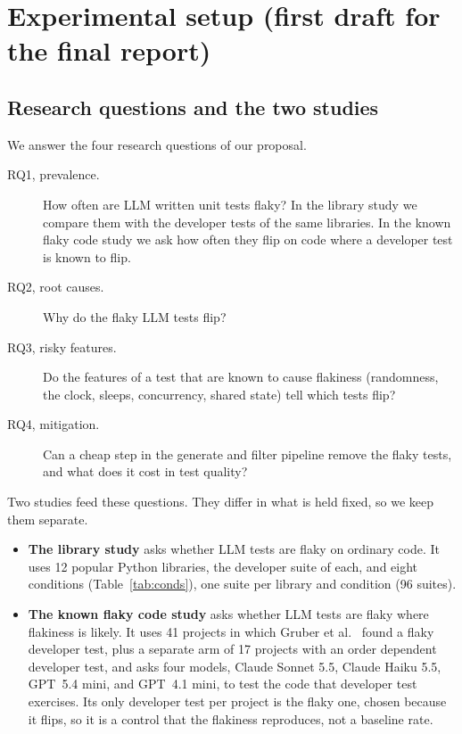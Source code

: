 \section{Experimental setup (first draft for the final report)}
\label{sec:setup}

\subsection{Research questions and the two studies}
We answer the four research questions of our proposal.
\begin{description}
\item[RQ1, prevalence.] How often are LLM written unit tests flaky? In the library study we compare them with the developer tests of the same libraries. In the known flaky code study we ask how often they flip on code where a developer test is known to flip.
\item[RQ2, root causes.] Why do the flaky LLM tests flip?
\item[RQ3, risky features.] Do the features of a test that are known to cause flakiness (randomness, the clock, sleeps, concurrency, shared state) tell which tests flip?
\item[RQ4, mitigation.] Can a cheap step in the generate and filter pipeline remove the flaky tests, and what does it cost in test quality?
\end{description}
Two studies feed these questions. They differ in what is held fixed, so we keep them separate.
\begin{itemize}
\item \textbf{The library study} asks whether LLM tests are flaky on ordinary code. It uses 12 popular Python libraries, the developer suite of each, and eight conditions (Table~\ref{tab:conds}), one suite per library and condition (96 suites).
\item \textbf{The known flaky code study} asks whether LLM tests are flaky where flakiness is likely. It uses 41 projects in which Gruber et al.~\cite{gruber2021} found a flaky developer test, plus a separate arm of 17 projects with an order dependent developer test, and asks four models, Claude Sonnet 5.5, Claude Haiku 5.5, GPT~5.4 mini, and GPT~4.1 mini, to test the code that developer test exercises. Its only developer test per project is the flaky one, chosen because it flips, so it is a control that the flakiness reproduces, not a baseline rate.
\end{itemize}

